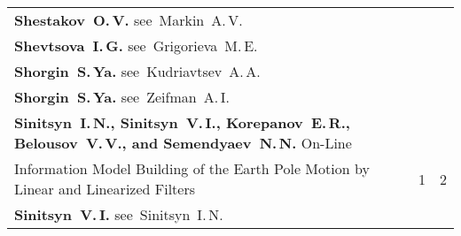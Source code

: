 {\begin{tabular}{p{399pt}rr}
$$\textbf{Shestakov~O.\,V.} see~Markin~A.\,V.&&\\
\textbf{Shevtsova~I.\,G.} see~Grigorieva~M.\,E.&&\\
\textbf{Shorgin~S.\,Ya.} see~Kudriavtsev~A.\,A.&&\\
\textbf{Shorgin~S.\,Ya.} see~Zeifman~A.\,I.&&\\
\hangindent=23pt\noindent\textbf{Sinitsyn~I.\,N., Sinitsyn~V.\,I., Korepanov~E.\,R., Belousov~V.\,V., and 
Semendyaev~N.\,N.} On-Line\linebreak
\vspace*{-12pt}\\
\hspace*{23pt}Information Model Building of the Earth Pole Motion by 
Linear and Linearized Filters&1&2\\
\textbf{Sinitsyn~V.\,I.} see~Sinitsyn~I.\,N.&&\\
\end{tabular}
}

